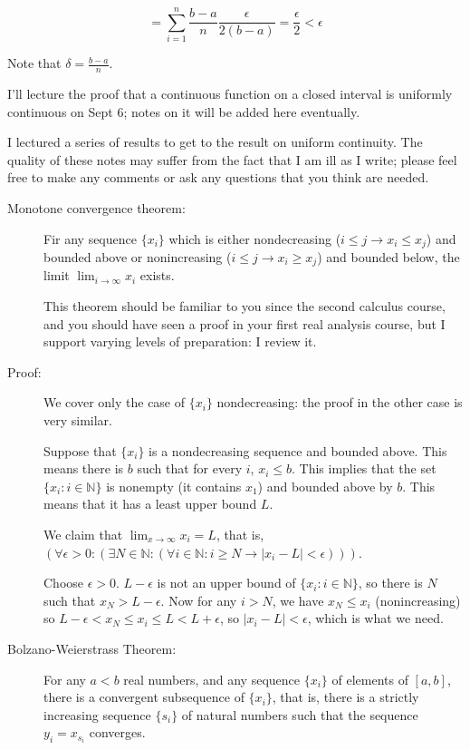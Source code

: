 \documentclass[12pt]{article}
\begin{document}
$$= \sum_{i=1}^n \frac{b-a}n \frac  {\epsilon}{2(b-a)} = \frac\epsilon2 < \epsilon$$

Note that $\delta=\frac{b-a}n$.

I'll lecture the proof that a continuous function on a closed interval is uniformly continuous on Sept 6;  notes on it will be added here eventually.

I lectured a series of results to get to the result on uniform continuity.  The quality of these notes may suffer from the fact that I am ill as I write;  please feel free to make any comments
or ask any questions that you think are needed.

\begin{description}

\item[Monotone convergence theorem:]  Fir any sequence $\{x_i\}$ which is either nondecreasing  ($i \leq j \rightarrow x_i \leq x_j$) and bounded above or nonincreasing ($i \leq j \rightarrow x_i \geq x_j$) and bounded below,
the limit $\lim_{i \rightarrow \infty} x_i$ exists.

This theorem should be familiar to you since the second calculus course, and you should have seen a proof in your first real analysis course, but I support varying levels of preparation:  I review it.

\item[Proof:]  We cover only the case of $\{x_i\}$ nondecreasing:  the proof in the other case is very similar.

Suppose that $\{x_i\}$ is a nondecreasing sequence and bounded above.  This means there is $b$ such that for every $i$, $x_i \leq b$.  This implies that the set $\{x_i:i \in \mathbb N\}$
is nonempty (it contains $x_1$) and bounded above by $b$.  This means that it has a least upper bound $L$.

We claim that $\lim_{x \rightarrow \infty}x_i = L$, that is, $(\forall \epsilon>0:(\exists N \in \mathbb N:(\forall i \in \mathbb N: i \geq N \rightarrow |x_i-L| <\epsilon)))$.

Choose $\epsilon>0$.  $L-\epsilon$ is not an upper bound of $\{x_i:i \in \mathbb N\}$, so there is $N$ such
that $x_N>L-\epsilon$.  Now for any $i > N$, we have $x_N \leq x_i$ (nonincreasing) so $L -\epsilon < x_N \leq x_i \leq L<L + \epsilon$, so
$|x_i -L|<\epsilon$, which is what we need.

\item[Bolzano-Weierstrass Theorem:]  For any $a < b$ real numbers, and any sequence $\{x_i\}$ of elements of $[a,b]$, there is a convergent subsequence of $\{x_i\}$, that is, there is a strictly increasing sequence
$\{s_i\}$ of natural numbers such that the sequence $y_i = x_{s_i}$ converges.


\end{description}
\end{document}
